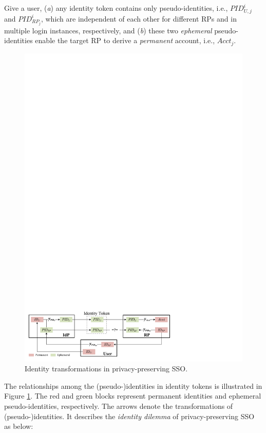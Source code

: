 Give a user,
    (\emph{a}) any identity token contains only pseudo-identities, i.e., $PID_{U,j}^i$ and $PID_{RP_j}^i$,
        which are independent of each other for different RPs and in multiple login instances, respectively,
    and (\emph{b}) these two \emph{ephemeral} pseudo-identities enable the target RP to derive a \emph{permanent} account, i.e., $Acct_j$.


\begin{figure}[bt]
  \centering
  \includegraphics[width=0.98\linewidth]{fig/IDCorrelation.pdf}
  \caption{Identity transformations in privacy-preserving SSO.}
  \label{fig:IDCorrelation}
\end{figure}

The relationships among the (pseudo-)identities in identity tokens is illustrated in Figure \ref{fig:IDCorrelation}.
The red and green blocks represent permanent identities and ephemeral pseudo-identities, respectively.
The arrows denote the transformations of (pseudo-)identities.
It describes the {\em identity dilemma} of privacy-preserving SSO as below:

